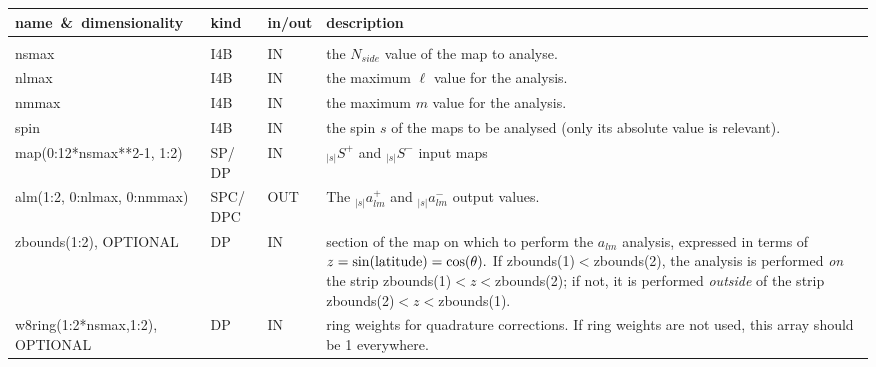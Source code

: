 \begin{arguments}
{
\begin{tabular}{p{0.4\hsize} p{0.05\hsize} p{0.05\hsize} p{0.40\hsize}} \hline  
\textbf{name~\&~dimensionality} & \textbf{kind} & \textbf{in/out} & \textbf{description} \\ \hline
                   &   &   &                           \\ %
nsmax & I4B & IN & the $N_{side}$ value of the map to analyse. \\
nlmax & I4B & IN & the maximum $\ell$ value for the analysis. \\
nmmax & I4B & IN & the maximum $m$ value for the analysis. \\
spin & I4B & IN & the spin $s$ of the maps to be analysed (only its absolute
value is relevant).\\
map(0:12*nsmax**2-1, 1:2) & SP/ DP & IN & ${_{|s|}}S^+$ and ${_{|s|}}S^-$ input maps\\
alm(1:2, 0:nlmax, 0:nmmax) & SPC/ DPC & OUT & The ${_{|s|}}a^+_{lm}$ and
${_{|s|}}a^-_{lm}$ output values. \\
zbounds(1:2), \hskip 4cm OPTIONAL & DP & IN & section of the map on which to perform the $a_{lm}$
                   analysis, expressed in terms of $z=\sin({\rm latitude}) =
                   \cos(\theta).$ If zbounds(1)$<$zbounds(2), the analysis is
                   performed {\em on} the strip zbounds(1)$<z<$zbounds(2); if not,
                   it is performed {\em outside} of the strip
                   zbounds(2)$<z<$zbounds(1). \\
w8ring(1:2*nsmax,1:2), \hskip 3cm OPTIONAL & DP & IN & ring weights for quadrature corrections. If ring weights are not used, this array should be 1 everywhere.
\end{tabular}
}
\end{arguments}

